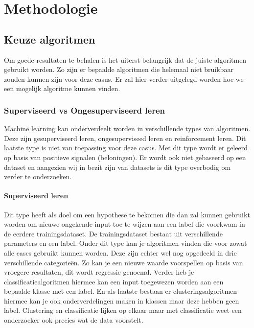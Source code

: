 
\chapter{Methodologie}
\label{ch:methodologie}



\section{Keuze algoritmen}
\label{sec:keuze-algoritmen}
Om goede resultaten te behalen is het uiterst belangrijk dat de juiste algoritmen gebruikt worden. Zo zijn er bepaalde algoritmen die helemaal niet bruikbaar zouden kunnen zijn voor deze casus. Er zal hier verder uitgelegd worden hoe we een mogelijk algoritme kunnen vinden.

\subsection{Superviseerd vs Ongesuperviseerd leren}
\label{sec: superviseerd-vs-ongesuperviseerd-leren}
Machine learning kan onderverdeelt worden in verschillende types van algoritmen. Deze zijn gesuperviseerd leren, ongesuperviseed leren en reinforcement leren. Dit laatste type is niet van toepassing voor deze casus. Met dit type wordt er geleerd op basis van positieve signalen (beloningen). Er wordt ook niet gebaseerd op een dataset en aangezien wij in bezit zijn van datasets is dit type overbodig om verder te onderzoeken. 

\subsubsection*{Superviseerd leren}
\label{sec: superviseerd-leren}
Dit type heeft als doel om een hypothese te bekomen die dan zal kunnen gebruikt worden om nieuwe ongekende input toe te wijzen aan een label die voorkwam in de eerdere trainingsdataset. De trainingsdataset bestaat uit verschillende parameters en een label. Onder dit type kan je algoritmen vinden die voor zowat alle cases gebruikt kunnen worden. Deze zijn echter wel nog opgedeeld in drie verschillende categorieën. Zo kan je een nieuwe waarde voorspellen op basis van vroegere resultaten, dit wordt regressie genoemd. Verder heb je classificatiealgoritmen hiermee kan een input toegewezen worden aan een bepaalde klasse met een label. En als laatste bestaan er clusteringsalgoritmen hiermee kan je ook onderverdelingen maken in klassen maar deze hebben geen label. Clustering en classificatie lijken op elkaar maar met classificatie weet een onderzoeker ook precies wat de data voorstelt. 

